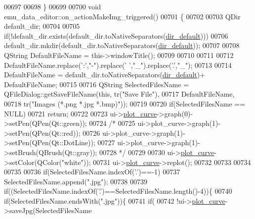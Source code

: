 \begin{DoxyCode}
{00697 
00698 \}
00699 
00700 \textcolor{keywordtype}{void} emu\_data\_editor::on\_actionMakeImg\_triggered()
00701 \{
00702 
00703     QDir default\_dir;
00704 
00705     \textcolor{keywordflow}{if}(!default\_dir.exists(default\_dir.toNativeSeparators(\hyperlink{a00008_aa55b7d8008e31fcc971692b493e7cf34}{dir\_default})))
00706         default\_dir.mkdir(default\_dir.toNativeSeparators(\hyperlink{a00008_aa55b7d8008e31fcc971692b493e7cf34}{dir\_default}));
00707 
00708     QString DefaultFileName = this->windowTitle();
00709 
00710 
00711 
00712     DefaultFileName.replace(\textcolor{charliteral}{':'},\textcolor{stringliteral}{"-"}).replace(\textcolor{charliteral}{' '},\textcolor{stringliteral}{"\_"}).replace(\textcolor{charliteral}{'.'},\textcolor{stringliteral}{"\_"});
00713 
00714     DefaultFileName = default\_dir.toNativeSeparators(\hyperlink{a00008_aa55b7d8008e31fcc971692b493e7cf34}{dir\_default})+ DefaultFileName;
00715 
00716     QString SelectedFilesName = QFileDialog::getSaveFileName(\textcolor{keyword}{this}, tr(\textcolor{stringliteral}{"Save File"}),
00717                                                         DefaultFileName,
00718                                                          tr(\textcolor{stringliteral}{"Images (*.png *.jpg *.bmp)"}));
00719 
00720     \textcolor{keywordflow}{if}(SelectedFilesName == NULL)
00721         \textcolor{keywordflow}{return};
00722 
00723     ui->\hyperlink{a00079_a1d46308dee8db7e3c99af65f13055479}{plot\_curve}->graph(0)->setPen(QPen(Qt::green));
00724     \textcolor{comment}{/*}
00725 \textcolor{comment}{    ui->plot\_curve->graph(1)->setPen(QPen(Qt::red));}
00726 \textcolor{comment}{    ui->plot\_curve->graph(1)->setPen(QPen(Qt::DotLine));}
00727 \textcolor{comment}{    ui->plot\_curve->graph(1)->setBrush(QBrush(Qt::gray));}
00728 \textcolor{comment}{    */}
00729 
00730     ui->\hyperlink{a00079_a1d46308dee8db7e3c99af65f13055479}{plot\_curve}->setColor(QColor(\textcolor{stringliteral}{"white"}));
00731     ui->\hyperlink{a00079_a1d46308dee8db7e3c99af65f13055479}{plot\_curve}->replot();
00732 
00733 
00734 
00735 
00736     \textcolor{keywordflow}{if}(SelectedFilesName.indexOf(\textcolor{charliteral}{'.'})==-1)
00737         SelectedFilesName.append(\textcolor{stringliteral}{".jpg"});
00738 
00739     \textcolor{keywordflow}{if}((SelectedFilesName.indexOf(\textcolor{charliteral}{'.'})==SelectedFilesName.length()-4))\{
00740     \textcolor{keywordflow}{if}(SelectedFilesName.endsWith(\textcolor{stringliteral}{".jpg"}))\{
00741        \textcolor{keywordflow}{if}(
00742         !ui->\hyperlink{a00079_a1d46308dee8db7e3c99af65f13055479}{plot\_curve}->saveJpg(SelectedFilesName
}
\end{DoxyCode}
